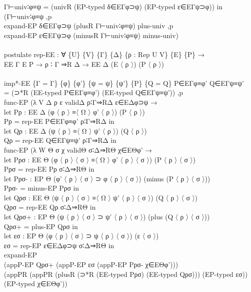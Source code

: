 {\begin{code}
{\>      Γ⊢univ∶φ≡ψ = (univR (EP-typed δ∈EΓφ⊃ψ) (EP-typed ε∈EΓψ⊃φ)) in\<\\
\>      (Γ⊢univ∶φ≡ψ ,p \<\\
\>      expand-EP δ∈EΓφ⊃ψ (plusR Γ⊢univ∶φ≡ψ) plus-univ ,p \<\\
\>      expand-EP ε∈EΓψ⊃φ (minusR Γ⊢univ∶φ≡ψ) minus-univ)\<\\
\>\<\\
\>postulate rep-EE : ∀ \{U\} \{V\} \{Γ\} \{Δ\} \{ρ : Rep U V\} \{E\} \{P\} →\<\\
\>                 EE Γ E P → ρ ∶ Γ ⇒R Δ → EE Δ (E 〈 ρ 〉) (P 〈 ρ 〉)\<\\
\>\<\\
\>imp*-EE \{Γ = Γ\} \{φ\} \{φ'\} \{ψ = ψ\} \{ψ'\} \{P\} \{Q = Q\} P∈EΓφ≡φ' Q∈EΓψ≡ψ' = (⊃*R (EE-typed P∈EΓφ≡φ') (EE-typed Q∈EΓψ≡ψ')) ,p \<\\
\>  func-EP (λ V Δ ρ ε validΔ ρ∶Γ⇒RΔ ε∈EΔφ⊃ψ →\<\\
\>    let Pρ : EE Δ (φ 〈 ρ 〉 ≡〈 Ω 〉 φ' 〈 ρ 〉) (P 〈 ρ 〉)\<\\
\>        Pρ = rep-EE P∈EΓφ≡φ' ρ∶Γ⇒RΔ in\<\\
\>    let Qρ : EE Δ (ψ 〈 ρ 〉 ≡〈 Ω 〉 ψ' 〈 ρ 〉) (Q 〈 ρ 〉)\<\\
\>        Qρ = rep-EE Q∈EΓψ≡ψ' ρ∶Γ⇒RΔ in\<\\
\>    func-EP (λ W Θ σ χ validΘ σ∶Δ⇒RΘ χ∈EΘφ' → \<\\
\>    let Pρσ : EE Θ (φ 〈 ρ 〉 〈 σ 〉 ≡〈 Ω 〉 φ' 〈 ρ 〉 〈 σ 〉) (P 〈 ρ 〉 〈 σ 〉)\<\\
\>        Pρσ = rep-EE Pρ σ∶Δ⇒RΘ in\<\\
\>    let Pρσ- : EP Θ (φ' 〈 ρ 〉 〈 σ 〉 ⊃ φ 〈 ρ 〉 〈 σ 〉) (minus (P 〈 ρ 〉 〈 σ 〉))\<\\
\>        Pρσ- = minus-EP Pρσ in\<\\
\>    let Qρσ : EE Θ (ψ 〈 ρ 〉 〈 σ 〉 ≡〈 Ω 〉 ψ' 〈 ρ 〉 〈 σ 〉) (Q 〈 ρ 〉 〈 σ 〉)\<\\
\>        Qρσ = rep-EE Qρ σ∶Δ⇒RΘ in\<\\
\>    let Qρσ+ : EP Θ (ψ 〈 ρ 〉 〈 σ 〉 ⊃ ψ' 〈 ρ 〉 〈 σ 〉) (plus (Q 〈 ρ 〉 〈 σ 〉))\<\\
\>        Qρσ+ = plus-EP Qρσ in\<\\
\>    let εσ : EP Θ (φ 〈 ρ 〉 〈 σ 〉 ⊃ ψ 〈 ρ 〉 〈 σ 〉) (ε 〈 σ 〉)\<\\
\>        εσ = rep-EP ε∈EΔφ⊃ψ σ∶Δ⇒RΘ in\<\\
\>    expand-EP \<\\
\>    (appP-EP Qρσ+ (appP-EP εσ (appP-EP Pρσ- χ∈EΘφ')))\<\\
\>    (appPR (appPR (plusR (⊃*R (EE-typed Pρσ) (EE-typed Qρσ))) (EP-typed εσ)) (EP-typed χ∈EΘφ')) \<\\
}
\end{code}}
